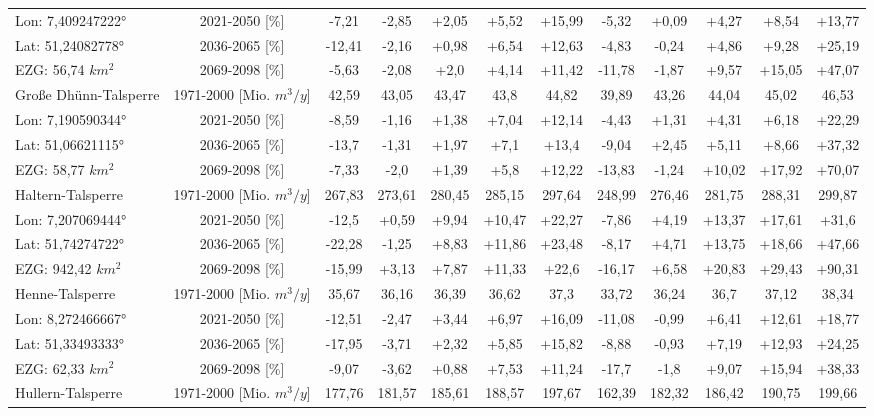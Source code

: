 \begin{longtable}{@{\extracolsep{\fill}}lc|ccccc||ccccc}
\cline{2-12} 
Lon: 7,409247222° & 2021-2050 [\%]  & -7,21 & -2,85 & +2,05 & +5,52 & +15,99 & -5,32 & +0,09 & +4,27 & +8,54 & +13,77\\ 
Lat: 51,24082778° & 2036-2065 [\%]  & -12,41 & -2,16 & +0,98 & +6,54 & +12,63 & -4,83 & -0,24 & +4,86 & +9,28 & +25,19\\ 
EZG: 56,74 $km^2$ & 2069-2098 [\%]  & -5,63 & -2,08 & +2,0 & +4,14 & +11,42 & -11,78 & -1,87 & +9,57 & +15,05 & +47,07\\ 
\hline 
Große Dhünn-Talsperre & 1971-2000 [Mio. $m^3/y$]  & 42,59 & 43,05 & 43,47 & 43,8 & 44,82 & 39,89 & 43,26 & 44,04 & 45,02 & 46,53\\ 
\cline{2-12} 
Lon: 7,190590344° & 2021-2050 [\%]  & -8,59 & -1,16 & +1,38 & +7,04 & +12,14 & -4,43 & +1,31 & +4,31 & +6,18 & +22,29\\ 
Lat: 51,06621115° & 2036-2065 [\%]  & -13,7 & -1,31 & +1,97 & +7,1 & +13,4 & -9,04 & +2,45 & +5,11 & +8,66 & +37,32\\ 
EZG: 58,77 $km^2$ & 2069-2098 [\%]  & -7,33 & -2,0 & +1,39 & +5,8 & +12,22 & -13,83 & -1,24 & +10,02 & +17,92 & +70,07\\ 
\hline 
Haltern-Talsperre & 1971-2000 [Mio. $m^3/y$]  & 267,83 & 273,61 & 280,45 & 285,15 & 297,64 & 248,99 & 276,46 & 281,75 & 288,31 & 299,87\\ 
\cline{2-12} 
Lon: 7,207069444° & 2021-2050 [\%]  & -12,5 & +0,59 & +9,94 & +10,47 & +22,27 & -7,86 & +4,19 & +13,37 & +17,61 & +31,6\\ 
Lat: 51,74274722° & 2036-2065 [\%]  & -22,28 & -1,25 & +8,83 & +11,86 & +23,48 & -8,17 & +4,71 & +13,75 & +18,66 & +47,66\\ 
EZG: 942,42 $km^2$ & 2069-2098 [\%]  & -15,99 & +3,13 & +7,87 & +11,33 & +22,6 & -16,17 & +6,58 & +20,83 & +29,43 & +90,31\\ 
\hline 
Henne-Talsperre & 1971-2000 [Mio. $m^3/y$]  & 35,67 & 36,16 & 36,39 & 36,62 & 37,3 & 33,72 & 36,24 & 36,7 & 37,12 & 38,34\\ 
\cline{2-12} 
Lon: 8,272466667° & 2021-2050 [\%]  & -12,51 & -2,47 & +3,44 & +6,97 & +16,09 & -11,08 & -0,99 & +6,41 & +12,61 & +18,77\\ 
Lat: 51,33493333° & 2036-2065 [\%]  & -17,95 & -3,71 & +2,32 & +5,85 & +15,82 & -8,88 & -0,93 & +7,19 & +12,93 & +24,25\\ 
EZG: 62,33 $km^2$ & 2069-2098 [\%]  & -9,07 & -3,62 & +0,88 & +7,53 & +11,24 & -17,7 & -1,8 & +9,07 & +15,94 & +38,33\\ 
\hline 
Hullern-Talsperre & 1971-2000 [Mio. $m^3/y$]  & 177,76 & 181,57 & 185,61 & 188,57 & 197,67 & 162,39 & 182,32 & 186,42 & 190,75 & 199,66\\ 

\end{longtable}
